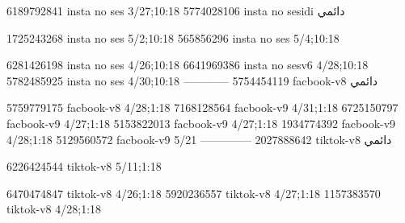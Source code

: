
6189792841 insta no ses
3/27;10:18
5774028106 insta no sesidi
دائمي


1725243268 insta no ses
5/2;10:18
565856296 insta no ses
5/4;10:18

6281426198 insta no ses
4/26;10:18
6641969386 insta no sesv6
4/28;10:18
5782485925 insta no ses
4/30;10:18
------------
5754454119 facbook-v8
دائمي

5759779175 facbook-v8
4/28;1:18
7168128564 facbook-v9
4/31;1:18
6725150797 facbook-v9
4/27;1:18
5153822013 facbook-v9
4/27;1:18
1934774392 facbook-v9
4/28;1:18
5129560572 facbook-v9
5/21
--------------
2027888642 tiktok-v8
دائمي

6226424544 tiktok-v8
5/11;1:18

6470474847 tiktok-v8
4/26;1:18
5920236557 tiktok-v8
4/27;1:18
1157383570 tiktok-v8
4/28;1:18
